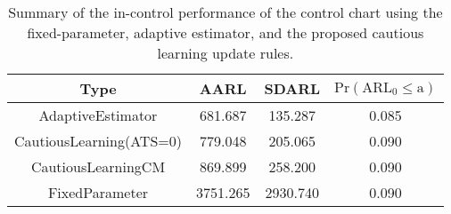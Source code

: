 \begin{table}[!h]

\caption{Summary of the in-control performance of the control chart using the fixed-parameter, adaptive estimator, and the proposed cautious learning update rules.}
\centering
\begin{tabular}[t]{cccc}
\toprule
Type & AARL & SDARL & $\text{Pr}(\text{ARL}_0 \leq \text{a})$\\
\midrule
AdaptiveEstimator & 681.687 & 135.287 & 0.085\\
CautiousLearning(ATS=0) & 779.048 & 205.065 & 0.090\\
CautiousLearningCM & 869.899 & 258.200 & 0.090\\
FixedParameter & 3751.265 & 2930.740 & 0.090\\
\bottomrule
\end{tabular}
\end{table}
